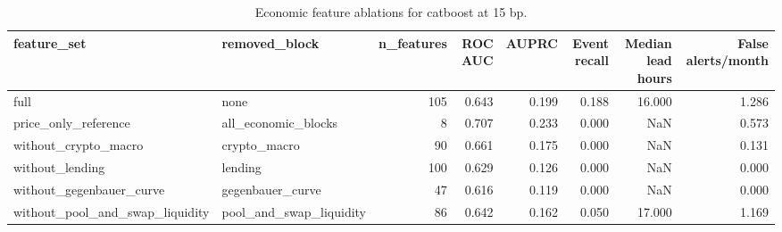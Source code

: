 \begin{table}
\caption{Economic feature ablations for catboost at 15 bp.}
\label{tab:ablation_15_catboost}
\begin{tabular}{llrrrrrr}
\toprule
feature\_set & removed\_block & n\_features & ROC AUC & AUPRC & Event recall & Median lead hours & False alerts/month \\
\midrule
full & none & 105 & 0.643 & 0.199 & 0.188 & 16.000 & 1.286 \\
price\_only\_reference & all\_economic\_blocks & 8 & 0.707 & 0.233 & 0.000 & NaN & 0.573 \\
without\_crypto\_macro & crypto\_macro & 90 & 0.661 & 0.175 & 0.000 & NaN & 0.131 \\
without\_lending & lending & 100 & 0.629 & 0.126 & 0.000 & NaN & 0.000 \\
without\_gegenbauer\_curve & gegenbauer\_curve & 47 & 0.616 & 0.119 & 0.000 & NaN & 0.000 \\
without\_pool\_and\_swap\_liquidity & pool\_and\_swap\_liquidity & 86 & 0.642 & 0.162 & 0.050 & 17.000 & 1.169 \\
\bottomrule
\end{tabular}
\end{table}

